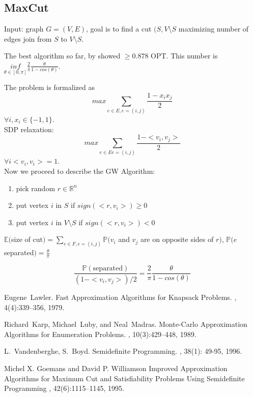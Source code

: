 \documentclass[11pt]{article}
\begin{document}
\subsection{MaxCut}
Input: graph $G = (V,E)$, goal is to find a cut $(S,V\setminus S$ maximizing number of edges join from $S$ to $V\setminus S$.

The best algorithm so far, by \cite{GoemansW95} showed $\ge 0.878$ OPT. This number is $\underset{\theta \in[0,\pi]}{inf} \frac{2}{\pi}\frac{\theta}{1-cos(\theta)}$.

The problem is formalized as 
$$max\sum_{e \in E, e =(i,j)} \frac{1-x_ix_j}{2}$$
$\forall i, x_i \in \{-1,1\}$. \\

SDP relaxation: 
$$max \sum_{e\in E e = (i,j)} \frac{1-<v_i,v_j>}{2}$$
$\forall i <v_i,v_i> = 1$.
\\

Now we proceed to describe the GW Algorithm:
\begin{enumerate}
\item pick random $r \in \mathbb{R}^n$
\item put vertex $i$ in $S$ if $sign(<r,v_i>)\ge 0$
\item put vertex $i$ in $V\setminus S$ if $sign(<r,v_i>) < 0$
\end{enumerate}

$\mathbb{E}($size of cut$) = \sum_{e\in F, e=(i,j)} \mathbb{P}(v_i$ and $v_j$ are on opposite sides of $r)$, $\mathbb{P}(e$ separated$) = \frac{\theta}{\pi}$

$$\frac{\mathbb{P}(\text{separated})}{(1-<v_i,v_j>)/2} = \frac{2}{\pi} \frac{\theta}{1-cos(\theta)}$$





\begin{thebibliography}{42}


Eugene~Lawler.
\newblock Fast Approximation Algorithms for Knapsack Problems.
, 4(4):339--356, 1979.


Richard~Karp, Michael~Luby, and Neal~Madras.
\newblock Monte-Carlo Approximation Algorithms for Enumeration Problems.
, 10(3):429--448, 1989.


L.~Vandenberghe, S.~Boyd.
\newblock Semidefinite Programming.
, 38(1): 49-95, 1996.


Michel X. Goemans and David P. Williamson
\newblock Improved Approximation Algorithms for Maximum Cut and Satisfiability Problems Using Semidefinite Programming
, 42(6):1115--1145, 1995.

\end{thebibliography}
\end{document}
